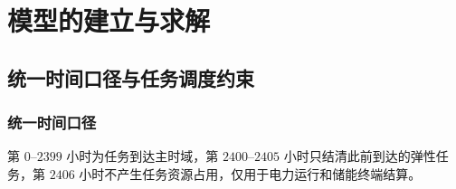 \section{模型的建立与求解}

\subsection{统一时间口径与任务调度约束}
\subsubsection{统一时间口径}
第 $0$--$2399$ 小时为任务到达主时域，第 $2400$--$2405$ 小时只结清此前到达的弹性任务，第 $2406$ 小时不产生任务资源占用，仅用于电力运行和储能终端结算。

